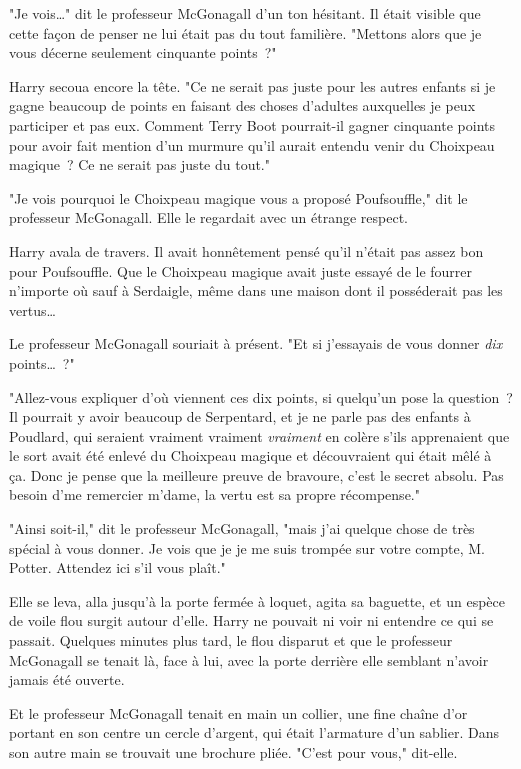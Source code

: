 "Je vois…" dit le professeur McGonagall d'un ton hésitant. Il était visible que cette façon de penser ne lui était pas du tout familière. "Mettons alors que je vous décerne seulement cinquante points~?"

Harry secoua encore la tête. "Ce ne serait pas juste pour les autres enfants si je gagne beaucoup de points en faisant des choses d'adultes auxquelles je peux participer et pas eux. Comment Terry Boot pourrait-il gagner cinquante points pour avoir fait mention d'un murmure qu'il aurait entendu venir du Choixpeau magique~? Ce ne serait pas juste du tout."

"Je vois pourquoi le Choixpeau magique vous a proposé Poufsouffle," dit le professeur McGonagall. Elle le regardait avec un étrange respect.

Harry avala de travers. Il avait honnêtement pensé qu'il n'était pas assez bon pour Poufsouffle. Que le Choixpeau magique avait juste essayé de le fourrer n'importe où sauf à Serdaigle, même dans une maison dont il posséderait pas les vertus…

Le professeur McGonagall souriait à présent. "Et si j'essayais de vous donner \emph{dix} points…~?"

"Allez-vous expliquer d'où viennent ces dix points, si quelqu'un pose la question~? Il pourrait y avoir beaucoup de Serpentard, et je ne parle pas des enfants à Poudlard, qui seraient vraiment vraiment \emph{vraiment} en colère s'ils apprenaient que le sort avait été enlevé du Choixpeau magique et découvraient qui était mêlé à ça. Donc je pense que la meilleure preuve de bravoure, c'est le secret absolu. Pas besoin d'me remercier m'dame, la vertu est sa propre récompense."

"Ainsi soit-il," dit le professeur McGonagall, "mais j'ai quelque chose de très spécial à vous donner. Je vois que je je me suis trompée sur votre compte, M. Potter. Attendez ici s'il vous plaît."

Elle se leva, alla jusqu'à la porte fermée à loquet, agita sa baguette, et un espèce de voile flou surgit autour d'elle. Harry ne pouvait ni voir ni entendre ce qui se passait. Quelques minutes plus tard, le flou disparut et que le professeur McGonagall se tenait là, face à lui, avec la porte derrière elle semblant n'avoir jamais été ouverte.

Et le professeur McGonagall tenait en main un collier, une fine chaîne d'or portant en son centre un cercle d'argent, qui était l'armature d'un sablier. Dans son autre main se trouvait une brochure pliée. "C'est pour vous," dit-elle.

